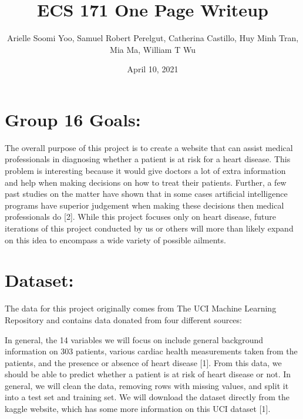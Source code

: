 \documentclass[12pt]{article}
\title{\normalsize ECS 171 One Page Writeup}
\author{\small Arielle Soomi Yoo, Samuel Robert Perelgut, Catherina Castillo, Huy Minh Tran, Mia Ma, William T Wu }
\date{April 10, 2021}
\begin{document}
\titlespacing*{\section}{0pt}{0.25cm}{0.25cm}
\titlespacing*{\subsection}{0pt}{0.5cm}{0.5cm}

\maketitle

\section*{\normalsize Group 16 Goals: }

The overall purpose of this project is to create a website that can assist 
medical professionals in diagnosing whether a patient is at risk for a heart 
disease. This problem is interesting because it would give doctors a lot of 
extra information and help when making decisions on how to treat their 
patients. Further, a few past studies on the matter have shown that in some 
cases artificial intelligence programs have superior judgement when making 
these decisions then medical professionals do [2]. While this project focuses 
only on heart disease, future iterations of this project conducted by us or 
others will more than likely expand on this idea to encompass a wide variety 
of possible ailments.

\section*{\normalsize Dataset: }

The data for this project originally comes from The UCI Machine Learning 
Repository and contains data donated from four different sources:

In general, the 14 variables we will focus on include general background 
information on 303 patients, various cardiac health measurements taken 
from the patients, and the presence or absence of heart disease [1]. 
From this data, we should be able to predict whether a patient is at risk of 
heart disease or not. In general, we will clean the data, removing rows with 
missing values, and split it into a test set and training set. We will 
download the dataset directly from the kaggle website, which has some more 
information on this UCI dataset [1].
\end{document}

